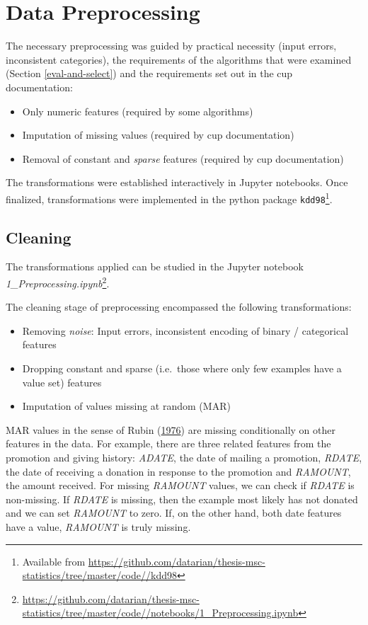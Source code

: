 \documentclass[
  11pt,
  a4paper,
  DIV=12,captions=tableheading,oneside,titlepage]{scrbook}
\providecommand{\tightlist}{%
  \setlength{\itemsep}{0pt}\setlength{\parskip}{0pt}}
\begin{document}
\hypertarget{data-preprocessing}{%
\section{Data Preprocessing}\label{data-preprocessing}}

The necessary preprocessing was guided by practical necessity (input errors, inconsistent categories), the requirements of the algorithms that were examined (Section \ref{eval-and-select}) and the requirements set out in the cup documentation:

\begin{itemize}
\tightlist
\item
  Only numeric features (required by some algorithms)
\item
  Imputation of missing values (required by cup documentation)
\item
  Removal of constant and \emph{sparse} features (required by cup documentation)
\end{itemize}

The transformations were established interactively in Jupyter notebooks. Once finalized, transformations were implemented in the python package \texttt{kdd98}\footnote{Available from \url{https://github.com/datarian/thesis-msc-statistics/tree/master/code//kdd98}}.

\hypertarget{cleaning}{%
\subsection{Cleaning}\label{cleaning}}

The transformations applied can be studied in the Jupyter notebook \emph{1\_Preprocessing.ipynb}\footnote{\url{https://github.com/datarian/thesis-msc-statistics/tree/master/code//notebooks/1_Preprocessing.ipynb}}.

The cleaning stage of preprocessing encompassed the following transformations:

\begin{itemize}
\tightlist
\item
  Removing \emph{noise}: Input errors, inconsistent encoding of binary / categorical features
\item
  Dropping constant and sparse (i.e.~those where only few examples have a value set) features
\item
  Imputation of values missing at random (MAR)
\end{itemize}

MAR values in the sense of Rubin (\protect\hyperlink{ref-rubin1976inference}{1976}) are missing conditionally on other features in the data. For example, there are three related features from the promotion and giving history: \emph{ADATE}, the date of mailing a promotion, \emph{RDATE}, the date of receiving a donation in response to the promotion and \emph{RAMOUNT}, the amount received. For missing \emph{RAMOUNT} values, we can check if \emph{RDATE} is non-missing. If \emph{RDATE} is missing, then the example most likely has not donated and we can set \emph{RAMOUNT} to zero. If, on the other hand, both date features have a value, \emph{RAMOUNT} is truly missing.
\end{document}
